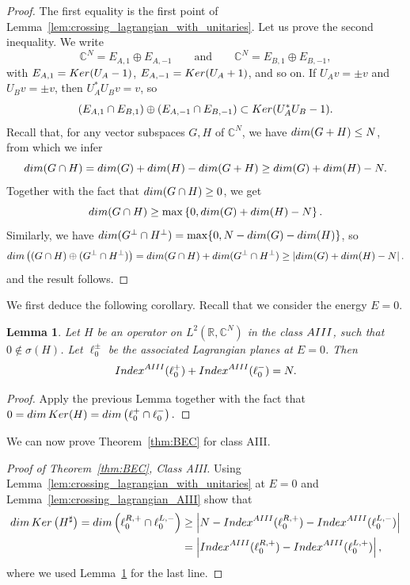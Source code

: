\documentclass[11pt]{amsart}
\numberwithin{equation}{section} %
\newtheorem{lemma}[theorem]{Lemma}
\newcommand\1{{\mathds 1}}
\def\C{{\mathbb C}}
\def\rAIII{{\rm AIII}}
\def\Index{{\rm Index}}
\def\Ker{{\rm Ker }}
\def\dim{{\rm dim }}
\begin{document}
\begin{proof}
    The first equality is the first point of Lemma~\ref{lem:crossing_lagrangian_with_unitaries}. Let us prove the second inequality. We write
    \[
        \C^{N} = E_{A, 1} \oplus E_{A,-1} \qquad \text{and} \qquad \C^N = E_{B, 1} \oplus E_{B, -1},
    \]
    with $E_{A, 1} = {\rm Ker}(U_A - 1)$, $E_{A, -1} = {\rm Ker}(U_A + 1)$, and so on. If $U_A v = \pm v$ and $U_B v = \pm v$, then $U_A^* U_B v = v$, so
    \[
        \left( E_{A, 1} \cap E_{B, 1} \right) \oplus \left(  E_{A, -1} \cap E_{B, -1} \right) \subset \Ker (U_A^* U_B - 1).
    \]
    Recall that, for any vector subspaces $G, H$ of $\C^N$, we have $\dim(G + H) \le N$, from which we infer 
    \[
        \dim (G \cap H) = \dim(G) + \dim(H) - \dim(G + H) \ge \dim(G) + \dim (H) - N.
    \]
    Together with the fact that $\dim(G \cap H) \ge 0$, we get
    \[
        \dim (G \cap H)  \ge \max \left\{ 0, \dim(G) + \dim (H) - N \right\}.
    \]
    Similarly, we have $\dim(G^\perp \cap H^\perp)  = \max \{ 0, N - \dim(G) - \dim(H) \}$, so
    \[
        \dim \left( ( G \cap H) \oplus (G^\perp \cap H^\perp) \right) = \dim(G \cap H) + \dim(G^\perp \cap H^\perp) \ge \left| \dim (G) + \dim(H) - N \right|.
    \]
    and the result follows.
\end{proof}

We first deduce the following corollary. Recall that we consider the energy $E = 0$.
\begin{lemma} \label{lem:ell+_ell-_bulkCase}
   Let $H$ be an operator on $L^2(\mathbb R,\C^N)$ in the class $\rAIII$, such that $0 \notin \sigma (H)$. Let $\ell_0^\pm$ be the associated Lagrangian planes at $E=0$. Then
    \[
          \Index^\rAIII(\ell_0^+) +  \Index^\rAIII( \ell_0^-) = N.
    \]
\end{lemma}
\begin{proof}
    Apply the previous Lemma together with the fact that 
    $
        0 = \dim \, \Ker(H) = \dim \left( \ell_0^+ \cap \ell_0^- \right).
    $
\end{proof}

We can now prove Theorem~\ref{thm:BEC} for class AIII.

\begin{proof}[Proof of Theorem~\ref{thm:BEC}, Class AIII] 
    Using Lemma~\ref{lem:crossing_lagrangian_with_unitaries} at $E = 0$ and Lemma~\ref{lem:crossing_lagrangian_AIII} show that
     \begin{align*}
        \dim \, \Ker \left( H^\sharp \right)  = \dim \left( \ell_0^{R, +} \cap \ell_0^{L, -}\right)
        &  \ge \left| N - \Index^\rAIII(\ell_0^{R, +}) -  \Index^\rAIII(\ell_0^{L, -} ) \right| \\
        & =  \left| \Index^\rAIII(\ell_0^{R, +}) -  \Index^\rAIII(\ell_0^{L, +} ) \right|,
    \end{align*}
    where we used Lemma~\ref{lem:ell+_ell-_bulkCase} for the last line.
\end{proof}
\end{document}
